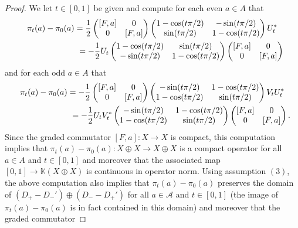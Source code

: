 \documentclass[pdftex]{sigma}
\numberwithin{equation}{section}
\newcommand{\op}{\oplus}
\newcommand{\s}[1]{\mathscr{#1}}
\newcommand{\B}[1]{\mathbb{#1}}
\begin{document}
\begin{proof}
We let $t \in [0,1]$ be given and compute for each even $a \in A$ that
\begin{gather*}
\pi_t(a) - \pi_0(a)
 = \frac{1}{2} \left(\begin{matrix} [F,a] & 0 \\ 0 & [F,a]\end{matrix}\right) \left(\begin{matrix} 1 - \cos(t \pi/2) & - \sin(t \pi /2) \\ \sin(t \pi/2) & 1 - \cos( t \pi/2)\end{matrix}\right) U_t^* \nonumber\\
\hphantom{\pi_t(a) - \pi_0(a)=}{} = -\frac{1}{2} U_t \left(\begin{matrix} 1 - \cos(t \pi/2) & \sin(t \pi /2) \\ -\sin(t \pi/2) & 1 - \cos( t \pi/2)\end{matrix}\right) \left(\begin{matrix} [F,a] & 0 \\ 0 & [F,a]\end{matrix}\right)%
\end{gather*}
and for each odd $a \in A$ that
\begin{gather*}
\pi_t(a) - \pi_0(a)
 = - \frac{1}{2} \left(\begin{matrix} [F,a] & 0 \\ 0 & [F,a]\end{matrix}\right)
\left(\begin{matrix} -\sin(t \pi / 2) & 1 - \cos(t \pi/2) \\ 1 - \cos( t \pi/2) & \sin(t \pi/2) \end{matrix}\right) V_t U_t^* \\
\hphantom{\pi_t(a) - \pi_0(a)=}{} = -\frac{1}{2} U_t V_t^* \left(\begin{matrix} -\sin(t \pi / 2) & 1 - \cos(t \pi/2) \\ 1 - \cos( t \pi/2) & \sin(t \pi/2) \end{matrix}\right) \left(\begin{matrix} [F,a] & 0 \\ 0 & [F,a]\end{matrix}\right) .%
\end{gather*}
Since the graded commutator $[F,a]\colon X \to X$ is compact, this computation implies that $\pi_t(a) - \pi_0(a)\colon X \op X \to X \op X$ is a compact operator for all $a \in A$ and $t \in [0,1]$ and moreover that the associated map $[0,1] \to \B K(X \op X)$ is continuous in operator norm. Using assumption $(3)$, the above computation also implies that $\pi_t(a) - \pi_0(a)$ preserves the domain of $(D_+ - D_-') \op (D_- - D_+')$ for all $a \in \s A$ and $t \in [0,1]$ (the image of $\pi_t(a) - \pi_0(a)$ is in fact contained in this domain) and moreover that the graded commutator

\end{proof}
\end{document}

